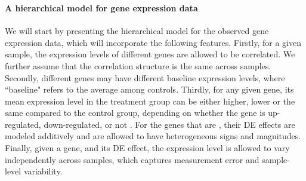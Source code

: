 	\subsubsection{\OurMethod}
	\paragraph{A hierarchical model for gene expression data}\label{subsection:YModel}
	We will start by presenting the hierarchical model for the observed gene expression data, which
	will incorporate the following features. Firstly, for a given sample, the expression levels of 
	different genes are allowed to be correlated. We further assume that the correlation structure 
	is the same across samples. Secondly, different genes may have different baseline expression 
	levels, where ``baseline" refers to the	average among controls. Thirdly, for any given gene, 
	its mean expression level in the treatment group can be either higher, lower or the same 
	compared to the control group, depending on whether the gene is up-regulated, down-regulated, 
	or not \DED. For the genes that are \DED, their DE effects are modeled 
	additively and are allowed to have heterogeneous signs and magnitudes. Finally, given a gene, 
	and its DE effect, the expression level is allowed to vary independently across samples, which 
	captures measurement error and sample-level variability.
	
